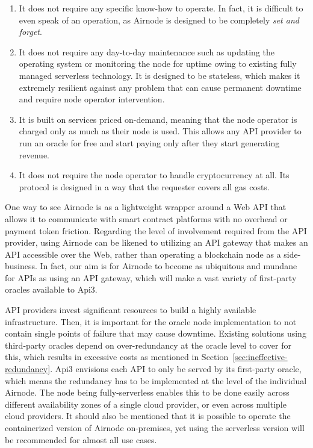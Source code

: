 \documentclass[11pt]{article}
\begin{document}
\begin{enumerate}
    \item It does not require any specific know-how to operate.
    In fact, it is difficult to even speak of an operation, as Airnode is designed to be completely \textit{set and forget}.
    \item It does not require any day-to-day maintenance such as updating the operating system or monitoring the node for uptime owing to existing fully managed serverless technology.
    It is designed to be stateless, which makes it extremely resilient against any problem that can cause permanent downtime and require node operator intervention.
    \item It is built on services priced on-demand, meaning that the node operator is charged only as much as their node is used.
    This allows any API provider to run an oracle for free and start paying only after they start generating revenue.
    \item It does not require the node operator to handle cryptocurrency at all.
    Its protocol is designed in a way that the requester covers all gas costs.
\end{enumerate}

One way to see Airnode is as a lightweight wrapper around a Web API that allows it to communicate with smart contract platforms with no overhead or payment token friction.
Regarding the level of involvement required from the API provider, using Airnode can be likened to utilizing an API gateway that makes an API accessible over the Web, rather than operating a blockchain node as a side-business.
In fact, our aim is for Airnode to become as ubiquitous and mundane for APIs as using an API gateway, which will make a vast variety of first-party oracles available to Api3.

API providers invest significant resources to build a highly available infrastructure.
Then, it is important for the oracle node implementation to not contain single points of failure that may cause downtime.
Existing solutions using third-party oracles depend on over-redundancy at the oracle level to cover for this, which results in excessive costs as mentioned in Section~\ref{sec:ineffective-redundancy}.
Api3 envisions each API to only be served by its first-party oracle, which means the redundancy has to be implemented at the level of the individual Airnode.
The node being fully-serverless enables this to be done easily across different availability zones of a single cloud provider, or even across multiple cloud providers.
It should also be mentioned that it is possible to operate the containerized version of Airnode on-premises, yet using the serverless version will be recommended for almost all use cases.
\end{document}
